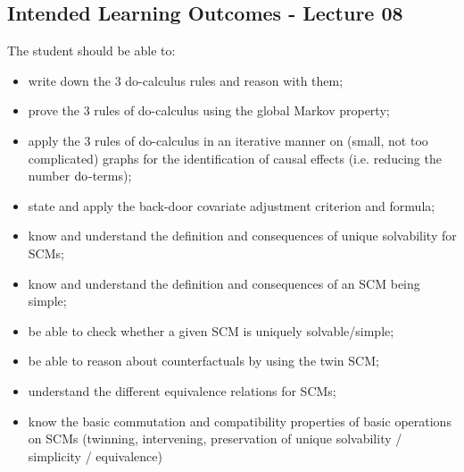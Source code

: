 \subsection*{Intended Learning Outcomes - Lecture 08}

The student should be able to:
\begin{itemize}
\item write down the 3 do-calculus rules and reason with them;
\item prove the 3 rules of do-calculus using the global Markov property;
\item apply the 3 rules of do-calculus in an iterative manner on (small, not too complicated) graphs for the identification of causal effects (i.e. reducing the number $\operatorname{do}$-terms);
\item state and apply the back-door covariate adjustment criterion and formula;
\item know and understand the definition and consequences of unique solvability for SCMs;
\item know and understand the definition and consequences of an SCM being simple;
\item be able to check whether a given SCM is uniquely solvable/simple;
\item be able to reason about counterfactuals by using the twin SCM;
\item understand the different equivalence relations for SCMs;
\item know the basic commutation and compatibility properties of basic operations on SCMs (twinning, intervening, preservation of unique solvability / simplicity / equivalence)
\end{itemize}
